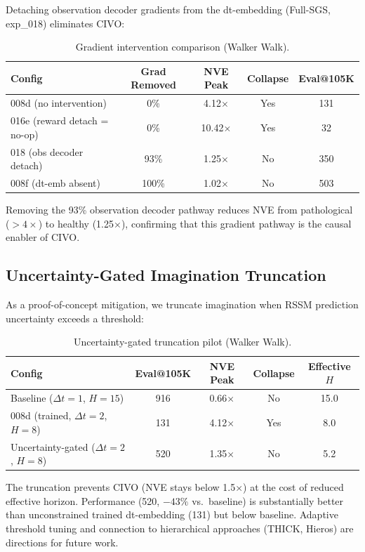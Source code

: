 \documentclass[10pt,letterpaper]{article}
\begin{document}
Detaching observation decoder gradients from the dt-embedding (Full-SGS, exp\_018) eliminates CIVO:

\begin{table}[h]
\centering
\caption{Gradient intervention comparison (Walker Walk).}
\label{tab:full_sgs}
\begin{tabular}{lcccc}
\toprule
Config & Grad Removed & NVE Peak & Collapse & Eval@105K \\
\midrule
008d (no intervention) & 0\% & 4.12$\times$ & Yes & 131 \\
016e (reward detach = no-op) & 0\% & 10.42$\times$ & Yes & 32 \\
018 (obs decoder detach) & 93\% & 1.25$\times$ & No & 350 \\
008f (dt-emb absent) & 100\% & 1.02$\times$ & No & 503 \\
\bottomrule
\end{tabular}
\end{table}

Removing the 93\% observation decoder pathway reduces NVE from pathological ($> 4\times$) to healthy (1.25$\times$), confirming that this gradient pathway is the causal enabler of CIVO.

\subsection{Uncertainty-Gated Imagination Truncation}
\label{sec:truncation}

As a proof-of-concept mitigation, we truncate imagination when RSSM prediction uncertainty exceeds a threshold:

\begin{table}[h]
\centering
\caption{Uncertainty-gated truncation pilot (Walker Walk).}
\label{tab:truncation}
\begin{tabular}{lcccc}
\toprule
Config & Eval@105K & NVE Peak & Collapse & Effective $H$ \\
\midrule
Baseline ($\Delta t{=}1$, $H{=}15$) & 916 & 0.66$\times$ & No & 15.0 \\
008d (trained, $\Delta t{=}2$, $H{=}8$) & 131 & 4.12$\times$ & Yes & 8.0 \\
Uncertainty-gated ($\Delta t{=}2$, $H{=}8$) & 520 & 1.35$\times$ & No & 5.2 \\
\bottomrule
\end{tabular}
\end{table}

The truncation prevents CIVO (NVE stays below 1.5$\times$) at the cost of reduced effective horizon. Performance (520, $-43\%$ vs.\ baseline) is substantially better than unconstrained trained dt-embedding (131) but below baseline. Adaptive threshold tuning and connection to hierarchical approaches (THICK, Hieros) are directions for future work.
\end{document}
